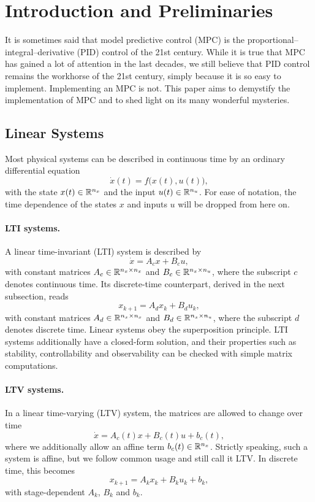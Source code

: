 \section{Introduction and Preliminaries}

It is sometimes said that model predictive control (MPC) is the proportional--integral--derivative (PID) control of the 21st century.
While it is true that MPC has gained a lot of attention in the last decades, we still believe that PID control remains the workhorse of the 21st century, simply because it is so easy to implement.
Implementing an MPC is not.
This paper aims to demystify the implementation of MPC and to shed light on its many wonderful mysteries.

\subsection{Linear Systems}

Most physical systems can be described in continuous time by an ordinary differential equation
\[
\dot{x}(t) = f\big(x(t), u(t)\big),
\]
with the state $x(t) \in \mathbb{R}^{n_x}$ and the input $u(t) \in \mathbb{R}^{n_u}$.
For ease of notation, the time dependence of the states $x$ and inputs $u$ will be dropped from here on.

\paragraph{LTI systems.}
A linear time-invariant (LTI) system is described by
\[
\dot{x} = A_c x + B_c u,
\]
with constant matrices $A_c \in \mathbb{R}^{n_x \times n_x}$ and $B_c \in \mathbb{R}^{n_x \times n_u}$, where the subscript $c$ denotes continuous time.
Its discrete-time counterpart, derived in the next subsection, reads
\[
x_{k+1} = A_d x_k + B_d u_k,
\]
with constant matrices $A_d \in \mathbb{R}^{n_x \times n_x}$ and $B_d \in \mathbb{R}^{n_x \times n_u}$, where the subscript $d$ denotes discrete time.
Linear systems obey the superposition principle.
LTI systems additionally have a closed-form solution, and their properties such as stability, controllability and observability can be checked with simple matrix computations.

\paragraph{LTV systems.}
In a linear time-varying (LTV) system, the matrices are allowed to change over time
\[
\dot{x} = A_c(t) x + B_c(t) u + b_c(t),
\]
where we additionally allow an affine term $b_c(t) \in \mathbb{R}^{n_x}$.
Strictly speaking, such a system is affine, but we follow common usage and still call it LTV.
In discrete time, this becomes
\[
x_{k+1} = A_k x_k + B_k u_k + b_k,
\]
with stage-dependent $A_k$, $B_k$ and $b_k$.

